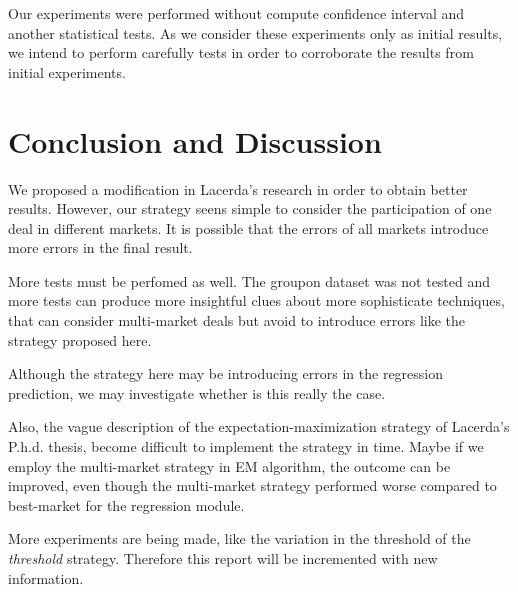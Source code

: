 \documentclass{acm_proc_article-sp}
\begin{document}
Our experiments were performed without compute confidence interval and 
another statistical tests. As we consider these experiments only 
as initial results, we intend to perform carefully tests in order 
to corroborate the results from initial experiments.

\section{Conclusion and Discussion}

We proposed a modification in Lacerda's research in order to 
obtain better results. However, our strategy seens simple 
to consider the participation of one deal in different markets. 
It is possible that the errors of all markets 
 introduce more errors in the final result. 
 
 More tests must be perfomed  as well. The groupon dataset was not 
 tested and more tests can produce more insightful clues about 
 more sophisticate techniques, that can consider multi-market deals 
 but avoid to introduce errors like the strategy proposed here. 

 Although the strategy here may be introducing errors in the 
 regression prediction, we may investigate whether is this really 
 the case.

Also, the vague description of the expectation-maximization strategy 
of Lacerda's P.h.d. thesis, become difficult to implement 
the strategy in time. Maybe if we employ the multi-market 
strategy in EM algorithm, the outcome can be improved, even though 
 the multi-market strategy 
performed worse compared to best-market for the regression 
module.

More experiments are being made, like the variation in the 
threshold of the \emph{threshold} strategy. Therefore this report will be 
incremented with new information.
%

%
%
\end{document}
